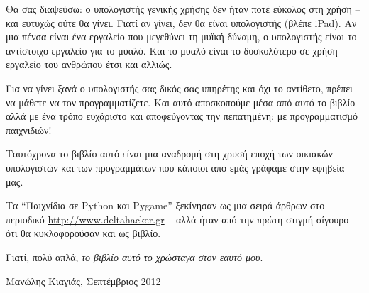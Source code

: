 Θα σας διαψεύσω: ο υπολογιστής γενικής χρήσης δεν ήταν ποτέ εύκολος στη
χρήση -- και ευτυχώς ούτε θα γίνει. Γιατί αν γίνει, δεν θα είναι υπολογιστής
(βλέπε iPad). Αν μια πένσα είναι ένα εργαλείο που μεγεθύνει τη μυϊκή
δύναμη, ο υπολογιστής είναι το αντίστοιχο εργαλείο για το μυαλό. Και το μυαλό είναι το δυσκολότερο σε χρήση εργαλείο του ανθρώπου έτσι και αλλιώς.

Για να γίνει ξανά ο υπολογιστής σας δικός σας υπηρέτης και όχι το αντίθετο, πρέπει να μάθετε να τον προγραμματίζετε. Και αυτό αποσκοπούμε μέσα από αυτό το βιβλίο -- αλλά με ένα τρόπο ευχάριστο και αποφεύγοντας την πεπατημένη: με προγραμματισμό παιχνιδιών!

Ταυτόχρονα το βιβλίο αυτό είναι μια αναδρομή στη χρυσή εποχή των οικιακών υπολογιστών και των προγραμμάτων που κάποιοι από εμάς γράφαμε στην εφηβεία μας.

Τα ``Παιχνίδια σε Python και Pygame'' ξεκίνησαν ως μια σειρά άρθρων στο περιοδικό \url{http://www.deltahacker.gr} -- αλλά ήταν από την πρώτη στιγμή σίγουρο
ότι θα κυκλοφορούσαν και ως βιβλίο.

Γιατί, πολύ απλά, {\em το βιβλίο αυτό το χρώσταγα στον εαυτό μου}.
\smallskip
\begin{flushright}
Μανώλης Κιαγιάς, Σεπτέμβριος 2012
\end{flushright}
\newpage
\tableofcontents
\listoffigures
